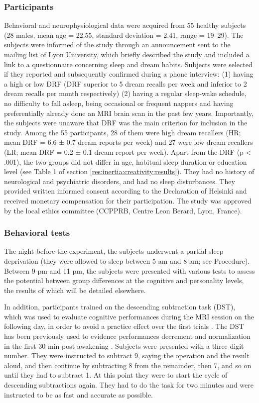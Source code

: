 \subsubsection*{Participants}
Behavioral and neurophysiological data were acquired from 55 healthy subjects (28 males, mean age = 22.55, standard deviation = 2.41, range = 19–29). The subjects were informed of the study through an announcement sent to the mailing list of Lyon University, which briefly described the study and included a link to a questionnaire concerning sleep and dream habits. Subjects were selected if they reported and subsequently confirmed during a phone interview: (1) having a high or low DRF (DRF superior to 5 dream recalls per week and inferior to 2 dream recalls per month respectively) (2) having a regular sleep-wake schedule, no difficulty to fall asleep, being occasional or frequent nappers and having preferentially already done an MRI brain scan in the past few years. Importantly, the subjects were unaware that DRF was the main criterion for inclusion in the study. Among the 55 participants, 28 of them were high dream recallers (HR; mean DRF = 6.6 ± 0.7 dream reports per week) and 27 were low dream recallers (LR; mean DRF = 0.2 ± 0.1 dream report per week). Apart from the DRF (p < .001), the two groups did not differ in age, habitual sleep duration or education level (see Table 1 of section \ref{res:inertia:creativity:results}). They had no history of neurological and psychiatric disorders, and had no sleep disturbances. They provided written informed consent according to the Declaration of Helsinki and received monetary compensation for their participation. The study was approved by the local ethics committee (CCPPRB, Centre Leon Berard, Lyon, France).

\subsubsection*{Behavioral tests}
The night before the experiment, the subjects underwent a partial sleep deprivation (they were allowed to sleep between 5 am and 8 am; see Procedure). Between 9 pm and 11 pm, the subjects were presented with various tests to assess the potential between group differences at the cognitive and personality levels, the results of which will be detailed elsewhere.

In addition, participants trained on the descending subtraction task (DST), which was used to evaluate cognitive performances during the MRI session on the following day, in order to avoid a practice effect over the first trials \citep{dinges_assessing_1985}. The DST has been previously used to evidence performances decrement and normalization in the first 30 min post awakening \citep{evans_recovery_1975, dinges_assessing_1985, stampi_ultrashort_1990}. Subjects were presented with a three-digit number. They were instructed to subtract 9, saying the operation and the result aloud, and then continue by subtracting 8 from the remainder, then 7, and so on until they had to subtract 1. At this point they were to start the cycle of descending subtractions again. They had to do the task for two minutes and were instructed to be as fast and accurate as possible.

